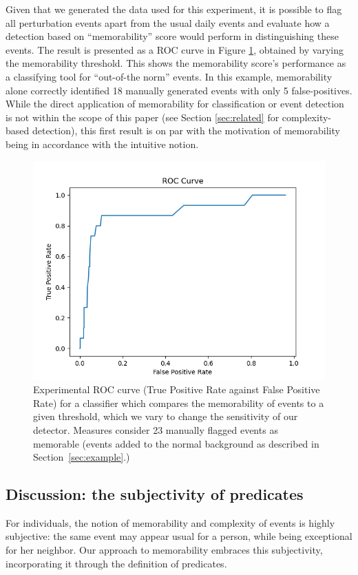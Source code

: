 \documentclass[entropy,article,submit,moreauthors,pdftex]{Definitions/mdpi}
\begin{document}
Given that we generated the data used for this experiment, it is possible to
flag all perturbation events apart from the usual daily events and evaluate how a
detection based on ``memorability'' score would perform in distinguishing these
events. The result is presented as a ROC curve in Figure \ref{fig:roc}, obtained by varying the memorability threshold. This shows the memorability score's performance as a classifying tool for ``out-of-the norm'' events. In this example, memorability alone correctly identified 18 manually generated events with only 5 false-positives. While the direct application of memorability for classification or event detection is not within the scope of this paper (see Section \ref{sec:related} for complexity-based detection), this first result is on par with the motivation of memorability being in accordance with the intuitive notion.

\begin{figure}[!ht]
    \centering
    \includegraphics[width=0.7\linewidth]{./figures/roc}
    \caption{Experimental ROC curve (True Positive Rate against False Positive
        Rate) for a classifier which compares the memorability of events to a given threshold, which we vary to change the sensitivity of our detector. Measures consider 23
        manually flagged events as memorable (events added to the normal background
        as described in Section~\ref{sec:example}.)}
    \label{fig:roc}
\end{figure}

\subsection{Discussion: the subjectivity of predicates}
\label{sec:discussion}
For individuals, the notion of memorability and complexity of events is highly subjective: the same event may appear usual for a person, while being exceptional for her neighbor. Our approach to memorability embraces this subjectivity, incorporating it through the definition of predicates.
\end{document}
